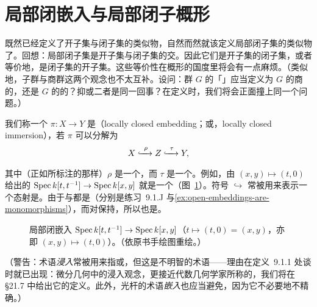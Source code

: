 
\section{局部闭嵌入与局部闭子概形}

既然已经定义了开子集与闭子集的类似物，自然而然就该定义局部闭子集的类似物了。回想：局部闭子集是开子集与闭子集的交。因此它们是开子集的闭子集，或者等价地，是闭子集的开子集。这些等价性在概形的国度里将会有一点麻烦。（类似地，子群与商群这两个观念也不太互补。设问：群 $G$ 的「\trSubquotient」应当定义为 $G$ 的商的\trSubgroup，还是 $G$ 的\trSubgroup{}的\trQuotient？抑或二者是同一回事？在定义\trLocally\trClosedEmbedding{}时，我们将会正面撞上同一个问题。）

我们称一个\trMorphism{} $\pi\colon X\to Y$ 是\textbf{\trLocally\trClosedEmbedding}（locally closed embedding；或\textbf{\trLocally\trClosedImmersion}，locally closed immersion），若 $\pi$ 可以分解为
\[
X\xhookrightarrow[\text{\trClosed}]{\ \rho\ } Z\xhookrightarrow[\text{\trOpen}]{\ \tau\ } Y,
\]
其中（正如所标注的那样）$\rho$ 是一个\trClosedEmbedding，而 $\tau$ 是一个\trOpenEmbedding。例如，由 $(x,y)\mapsto(t,0)$ 给出的\trMorphism{} $\operatorname{Spec} k[t,t^{-1}]\to\operatorname{Spec} k[x,y]$ 就是一个\trLocally\trClosedEmbedding（图~\ref{fig:locally-closed-embedding}）。符号 $\hookrightarrow$ 常被用来表示一个态射是\trLocally\trClosedEmbedding。由于\trClosedEmbedding{}与\trOpenEmbedding{}都是\trMonomorphism（分别是练习~9.1.J 与\cref{ex:open-embeddings-are-monomorphisms}），而\trMonomorphism{}对\trComposition{}保持，所以\trLocally\trClosedEmbedding{}也是\trMonomorphism。

\begin{figure}[htbp]
\centering
{}
\caption{局部闭嵌入 $\operatorname{Spec} k[t,t^{-1}]\to\operatorname{Spec} k[x,y]$（$t\mapsto(t,0)=(x,y)$，亦即 $(x,y)\mapsto(t,0)$）。（依原书手绘图重绘。）}\label{fig:locally-closed-embedding}
\end{figure}

（警告：术语\emph{浸入}常被用来指\emph{\trLocally\trClosedEmbedding}或\emph{\trLocally\trClosedImmersion}，但这是不明智的术语——理由在定义~9.1.1 处谈\trClosedEmbedding{}时就已出现：微分几何中的浸入观念，更接近代数几何学家所称的\trUnramified，我们将在 \S21.7 中给出它的定义。此外，光杆的术语\emph{嵌入}也应当避免，因为它不必要地不精确。）

